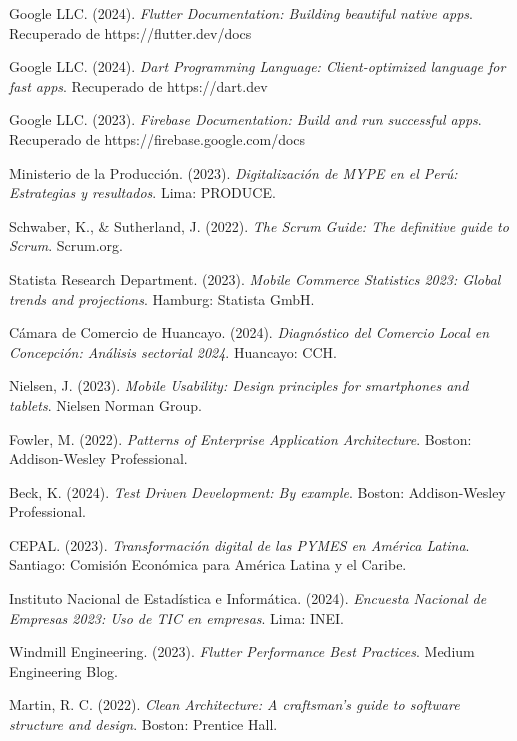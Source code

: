 \documentclass[12pt,a4paper]{report}
\begin{document}
\begin{thebibliography}{25}

	Google LLC. (2024). \textit{Flutter Documentation: Building beautiful native apps}. Recuperado de https://flutter.dev/docs

	Google LLC. (2024). \textit{Dart Programming Language: Client-optimized language for fast apps}. Recuperado de https://dart.dev

	Google LLC. (2023). \textit{Firebase Documentation: Build and run successful apps}. Recuperado de https://firebase.google.com/docs

	Ministerio de la Producción. (2023). \textit{Digitalización de MYPE en el Perú: Estrategias y resultados}. Lima: PRODUCE.

	Schwaber, K., \& Sutherland, J. (2022). \textit{The Scrum Guide: The definitive guide to Scrum}. Scrum.org.

	Statista Research Department. (2023). \textit{Mobile Commerce Statistics 2023: Global trends and projections}. Hamburg: Statista GmbH.

	Cámara de Comercio de Huancayo. (2024). \textit{Diagnóstico del Comercio Local en Concepción: Análisis sectorial 2024}. Huancayo: CCH.

	Nielsen, J. (2023). \textit{Mobile Usability: Design principles for smartphones and tablets}. Nielsen Norman Group.

	Fowler, M. (2022). \textit{Patterns of Enterprise Application Architecture}. Boston: Addison-Wesley Professional.

	Beck, K. (2024). \textit{Test Driven Development: By example}. Boston: Addison-Wesley Professional.

	CEPAL. (2023). \textit{Transformación digital de las PYMES en América Latina}. Santiago: Comisión Económica para América Latina y el Caribe.

	Instituto Nacional de Estadística e Informática. (2024). \textit{Encuesta Nacional de Empresas 2023: Uso de TIC en empresas}. Lima: INEI.

	Windmill Engineering. (2023). \textit{Flutter Performance Best Practices}. Medium Engineering Blog.

	Martin, R. C. (2022). \textit{Clean Architecture: A craftsman's guide to software structure and design}. Boston: Prentice Hall.


\end{thebibliography}
\end{document}
